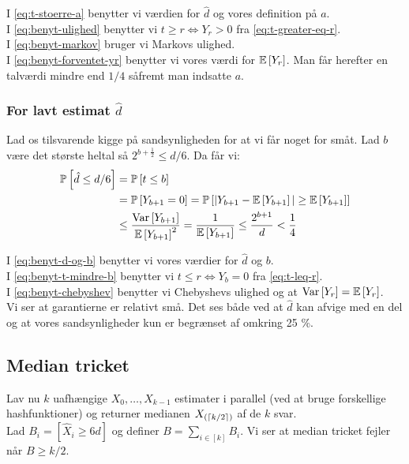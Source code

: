 I \cref{eq:t-stoerre-a} benytter vi værdien for $\hat d$ og vores definition på $a$.\\
I \cref{eq:benyt-ulighed} benytter vi $t \geq r \Longleftrightarrow Y_r > 0$ fra \cref{eq:t-greater-eq-r}.\\
I \cref{eq:benyt-markov} bruger vi Markovs ulighed.\\
I \cref{eq:benyt-forventet-yr} benytter vi vores værdi for $\mathbb{E} \left[  Y_r  \right]$. Man får herefter en talværdi mindre end $1/4$ såfremt man indsatte $a$.



\subsubsection{For lavt estimat $\hat d$}
Lad os tilsvarende kigge på sandsynligheden for at vi får noget for småt. Lad $b$ være det største heltal så $2^{b + \frac{1}{2}} \leq d/6$. Da får vi:
\begin{align}
  \mathbb{P} \left[  \hat d \leq d/6  \right]
  &= \mathbb{P} \left[  t \leq b  \right] \label{eq:benyt-d-og-b} \\
  &= \mathbb{P} \left[  Y_{b+1} = 0  \right]
  = \mathbb{P} \left[   |Y_{b+1} - \mathbb{E} \left[  Y_{b+1}  \right]| \geq \mathbb{E} \left[  Y_{b+1}  \right]   \right] \label{eq:benyt-t-mindre-b} \\
  &\leq \frac{\text{Var} \left[  Y_{b+1}  \right]}{ \mathbb{E} \left[  Y_{b+1}  \right]^2 }
  = \frac{1}{\mathbb{E} \left[  Y_{b+1}  \right]}
  \leq \frac{2^{b+1}}{d} \label{eq:benyt-chebyshev}
  < \frac{1}{4}
\end{align}

I \cref{eq:benyt-d-og-b} benytter vi vores værdier for $\hat d$ og $b$.\\
I \cref{eq:benyt-t-mindre-b} benytter vi $t \leq r \Longleftrightarrow Y_b = 0$ fra \cref{eq:t-leq-r}.\\
I \cref{eq:benyt-chebyshev} benytter vi Chebyshevs ulighed og at $\text{Var} \left[  Y_r  \right] = \mathbb{E} \left[  Y_r  \right]$.\\

Vi ser at garantierne er relativt små. Det ses både ved at $\hat d$ kan afvige med en del og at vores sandsynligheder kun er begrænset af omkring 25 \%.

\subsection{Median tricket}
Lav nu $k$ uafhængige $X_0, \dots, X_{k-1}$ estimater i parallel (ved at bruge forskellige hashfunktioner) og returner medianen $X_{(\left\lceil k/2 \right\rceil)}$ af de $k$ svar.\\


Lad $B_i = [\hat X_i \geq 6d]$ og definer $B = \sum_{i \in [k]}B_i$. Vi ser at median tricket fejler når $B \geq k/2$.\\


